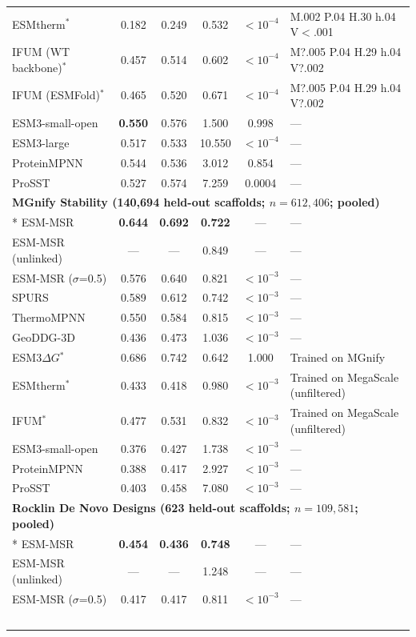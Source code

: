 {\begin{longtable}{lccccl}
ESMtherm$^*$ & 0.182 & 0.249 & 0.532 & $<10^{-4}$ & M.002 P.04 H.30 h.04 V$<$.001 \\
IFUM (WT backbone)$^*$ & 0.457 & 0.514 & 0.602 & $<10^{-4}$ & M?.005 P.04 H.29 h.04 V?.002 \\
IFUM (ESMFold)$^*$ & 0.465 & 0.520 & 0.671 & $<10^{-4}$ & M?.005 P.04 H.29 h.04 V?.002 \\
ESM3-small-open & \textbf{0.550} & 0.576 & 1.500 & 0.998 & --- \\
ESM3-large & 0.517 & 0.533 & 10.550 & $<10^{-4}$ & --- \\
ProteinMPNN & 0.544 & 0.536 & 3.012 & 0.854 & --- \\
ProSST & 0.527 & 0.574 & 7.259 & 0.0004 & --- \\
\midrule
\multicolumn{6}{l}{\textbf{MGnify Stability (140,694 held-out scaffolds; $n=612{,}406$; pooled)}} \\*
\midrule
ESM-MSR & \textbf{0.644} & \textbf{0.692} & \textbf{0.722} & --- & --- \\
ESM-MSR (unlinked) & --- & --- & 0.849 & --- & --- \\
ESM-MSR ($\sigma$=0.5) & 0.576 & 0.640 & 0.821 & $<10^{-3}$ & --- \\
SPURS & 0.589 & 0.612 & 0.742 & $<10^{-3}$ & --- \\
ThermoMPNN & 0.550 & 0.584 & 0.815 & $<10^{-3}$ & --- \\
GeoDDG-3D & 0.436 & 0.473 & 1.036 & $<10^{-3}$ & --- \\
ESM3$\Delta G$$^*$ & 0.686 & 0.742 & 0.642 & 1.000 & Trained on MGnify \\
ESMtherm$^*$ & 0.433 & 0.418 & 0.980 & $<10^{-3}$ & Trained on MegaScale (unfiltered) \\
IFUM$^*$ & 0.477 & 0.531 & 0.832 & $<10^{-3}$ & Trained on MegaScale (unfiltered) \\
ESM3-small-open & 0.376 & 0.427 & 1.738 & $<10^{-3}$ & --- \\
ProteinMPNN & 0.388 & 0.417 & 2.927 & $<10^{-3}$ & --- \\
ProSST & 0.403 & 0.458 & 7.080 & $<10^{-3}$ & --- \\
\midrule
\multicolumn{6}{l}{\textbf{Rocklin De Novo Designs (623 held-out scaffolds; $n=109{,}581$; pooled)}} \\*
\midrule
ESM-MSR & \textbf{0.454} & \textbf{0.436} & \textbf{0.748} & --- & --- \\
ESM-MSR (unlinked) & --- & --- & 1.248 & --- & --- \\
ESM-MSR ($\sigma$=0.5) & 0.417 & 0.417 & 0.811 & $<10^{-3}$ & --- \\
$$
\end{longtable}}
